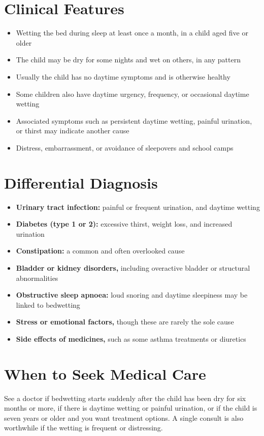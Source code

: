 \section*{Clinical Features}
\begin{itemize}
    \item Wetting the bed during sleep at least once a month, in a child aged five or older
    \item The child may be dry for some nights and wet on others, in any pattern
    \item Usually the child has no daytime symptoms and is otherwise healthy
    \item Some children also have daytime urgency, frequency, or occasional daytime wetting
    \item Associated symptoms such as persistent daytime wetting, painful urination, or thirst may indicate another cause
    \item Distress, embarrassment, or avoidance of sleepovers and school camps
\end{itemize}

\section*{Differential Diagnosis}
\begin{itemize}
    \item \textbf{Urinary tract infection:} painful or frequent urination, and daytime wetting
    \item \textbf{Diabetes (type 1 or 2):} excessive thirst, weight loss, and increased urination
    \item \textbf{Constipation:} a common and often overlooked cause
    \item \textbf{Bladder or kidney disorders,} including overactive bladder or structural abnormalities
    \item \textbf{Obstructive sleep apnoea:} loud snoring and daytime sleepiness may be linked to bedwetting
    \item \textbf{Stress or emotional factors,} though these are rarely the sole cause
    \item \textbf{Side effects of medicines,} such as some asthma treatments or diuretics
\end{itemize}

\section*{When to Seek Medical Care}
See a doctor if bedwetting starts suddenly after the child has been dry for six months or more, if there is daytime wetting or painful urination, or if the child is seven years or older and you want treatment options. A single consult is also worthwhile if the wetting is frequent or distressing.

